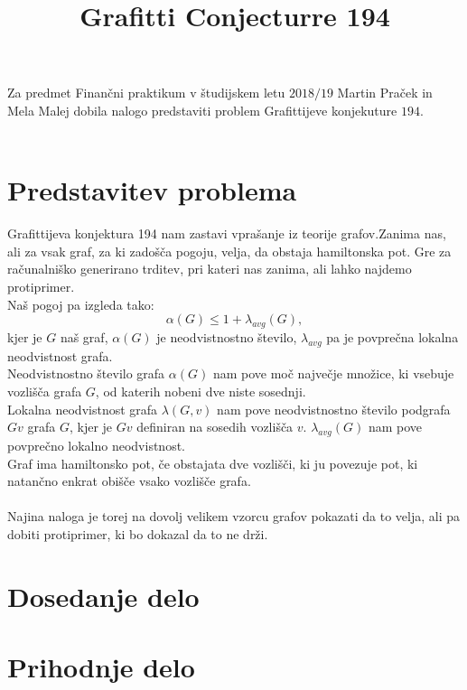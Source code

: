\documentclass[12pt,a4paper]{amsart}
\begin{document}
\title{Grafitti Conjecturre 194}
Za predmet Finančni praktikum v študijskem letu $2018/19$ Martin Praček in Mela Malej dobila nalogo predstaviti problem Grafittijeve konjekuture $194$. \\
\ \\
\section{Predstavitev problema}
Grafittijeva konjektura 194 nam zastavi vprašanje iz teorije grafov.Zanima nas, ali za vsak graf, za ki zadošča pogoju, velja, da obstaja hamiltonska pot. Gre za računalniško generirano trditev, pri kateri nas zanima, ali lahko najdemo protiprimer.\\
Naš pogoj pa izgleda tako:
$$ \alpha(G) \leq 1 + \lambda_{avg}(G),$$
kjer je $G$ naš graf, $\alpha(G)$ je neodvistnostno število, $\lambda_{avg}$ pa je povprečna lokalna neodvistnost grafa.\\
Neodvistnostno število grafa $\alpha(G)$ nam pove moč največje množice, ki vsebuje  vozlišča grafa $G$, od katerih nobeni dve niste sosednji.\\
Lokalna neodvistnost grafa $\lambda(G, v)$ nam pove neodvistnostno število podgrafa $Gv$ grafa $G$, kjer je $Gv$ definiran na sosedih vozlišča $v$. $\lambda_{avg}(G)$ nam pove povprečno lokalno neodvistnost.\\
Graf ima hamiltonsko pot, če obstajata dve vozlišči, ki ju povezuje pot, ki natančno enkrat obišče vsako vozlišče grafa.\\
\ \\
Najina naloga je torej na dovolj velikem vzorcu grafov pokazati da to velja, ali pa dobiti protiprimer, ki bo dokazal da to ne drži.\\
\section{Dosedanje delo}
\section{Prihodnje delo}
\end{document}

